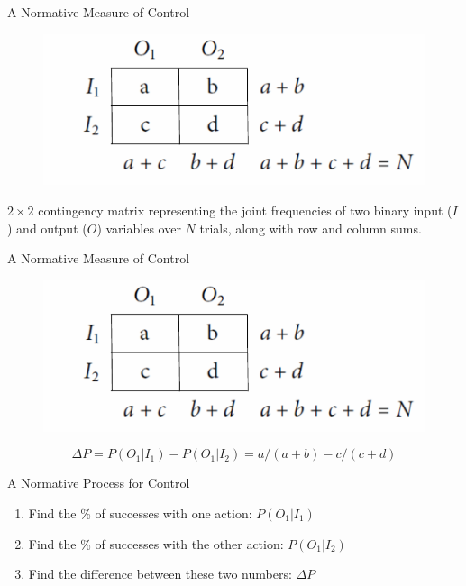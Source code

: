\documentclass{beamer}
\newcommand{\deltap}{$\Delta P$}
\begin{document}
\begin{frame}{A Normative Measure of Control}
	\begin{figure}
	\begin{center}
		\includegraphics[width=\linewidth]{contingencytable}
	\end{center}
	\end{figure}
	$2 \times 2$ contingency matrix representing the joint frequencies of two binary input ($I$) and output ($O$) variables over $N$ trials, along with row and column sums.
\end{frame}

\begin{frame}{A Normative Measure of Control}
	\begin{figure}
	\begin{center}
		\includegraphics[width=\linewidth]{contingencytable}
	\end{center}
	\end{figure}
	\begin{equation*}
		\Delta P = P(O_1|I_1) - P(O_1|I_2) = a/(a+b) - c/(c+d)
	\end{equation*}
\end{frame}

\begin{frame}{A Normative Process for Control}
	\begin{enumerate}
		\item Find the \% of successes with one action: $P(O_1|I_1)$
		\item Find the \% of successes with the other action: $P(O_1|I_2)$
		\item Find the difference between these two numbers: \deltap
	\end{enumerate}
\end{frame}
\end{document}
